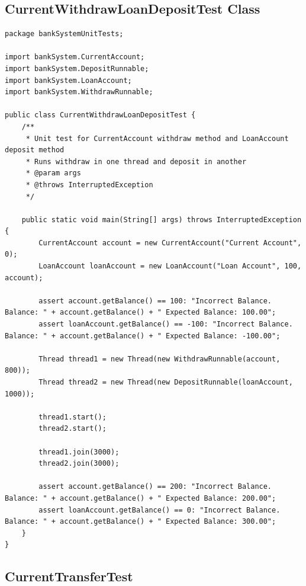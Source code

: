 \documentclass[a4paper,12pt]{article}
\begin{document}
\subsection{CurrentWithdrawLoanDepositTest Class} \label{appendix:CurrentWithdrawLoanDepositTest}

\begin{lstlisting}
package bankSystemUnitTests;

import bankSystem.CurrentAccount;
import bankSystem.DepositRunnable;
import bankSystem.LoanAccount;
import bankSystem.WithdrawRunnable;

public class CurrentWithdrawLoanDepositTest {
    /**
     * Unit test for CurrentAccount withdraw method and LoanAccount deposit method
     * Runs withdraw in one thread and deposit in another
     * @param args
     * @throws InterruptedException
     */

    public static void main(String[] args) throws InterruptedException {
        CurrentAccount account = new CurrentAccount("Current Account", 0);
        LoanAccount loanAccount = new LoanAccount("Loan Account", 100, account);

        assert account.getBalance() == 100: "Incorrect Balance. Balance: " + account.getBalance() + " Expected Balance: 100.00";
        assert loanAccount.getBalance() == -100: "Incorrect Balance. Balance: " + account.getBalance() + " Expected Balance: -100.00";

        Thread thread1 = new Thread(new WithdrawRunnable(account, 800));
        Thread thread2 = new Thread(new DepositRunnable(loanAccount, 1000));

        thread1.start();
        thread2.start();

        thread1.join(3000);
        thread2.join(3000);

        assert account.getBalance() == 200: "Incorrect Balance. Balance: " + account.getBalance() + " Expected Balance: 200.00";
        assert loanAccount.getBalance() == 0: "Incorrect Balance. Balance: " + account.getBalance() + " Expected Balance: 300.00";
    }
}
\end{lstlisting}

\subsection{CurrentTransferTest} \label{appendix:CurrentTransferTest}
\end{document}
